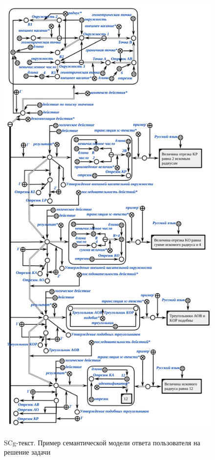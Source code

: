\begin{figure}[H]
	\caption{SCg-текст. Пример семантической модели ответа пользователя на решение задачи}
	\includegraphics[scale=0.7]{author/part7/figures/solving_task_example.png}
	\label{fig:STE_example}
\end{figure}

